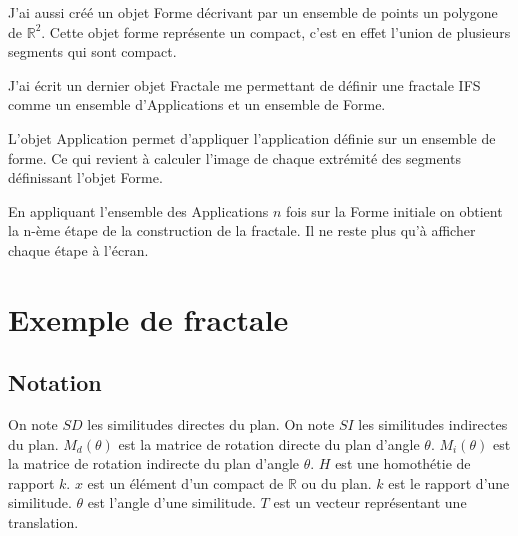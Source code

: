 \documentclass[a4paper, 12pt]{report}
\begin{document}
			\vspace{.2 cm}\hspace{.7 cm}
			J'ai aussi créé un objet Forme décrivant par un ensemble de points un polygone de $\mathds{R}^2$. Cette objet forme représente un compact, c'est en effet l'union de plusieurs segments qui sont compact.
			
			\vspace{.2 cm}\hspace{.7 cm}
			J'ai écrit un dernier objet Fractale me permettant de définir une fractale IFS comme un ensemble d'Applications et un ensemble de Forme.
			
			\vspace{.2 cm}\hspace{.7 cm}
			L'objet Application permet d'appliquer l'application définie sur un ensemble de forme. Ce qui revient à calculer l'image de chaque extrémité des segments définissant l'objet Forme.
	
			\vspace{.2 cm}\hspace{.7 cm}
			En appliquant l'ensemble des Applications $n$ fois sur la Forme initiale on obtient la n-ème étape de la construction de la fractale. Il ne reste plus qu'à afficher chaque étape à l'écran.
	
	
	
	\chapter{\bf Exemple de fractale}
		\section{Notation}
		On note $SD$ les similitudes directes du plan.\newline
		On note $SI$ les similitudes indirectes du plan.\newline
		$M_d(\theta)$ est la matrice de rotation directe du plan d'angle $\theta$.\newline
		$M_i(\theta)$ est la matrice de rotation indirecte du plan d'angle $\theta$.\newline
		$H$ est une homothétie de rapport $k$.
		$x$ est un élément d'un compact de $\mathds{R}$ ou du plan.\newline
		$k$ est le rapport d'une similitude.\newline
		$\theta$ est l'angle d'une similitude.\newline
		$T$ est un vecteur représentant une translation.\newline
		
\end{document}
